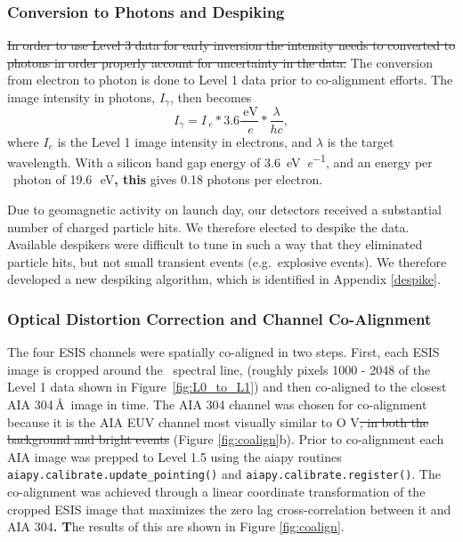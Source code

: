     
\subsubsection{Conversion to Photons and Despiking}
\sout{In order to use Level 3 data for early inversion the intensity needs to  converted to photons in order properly account for uncertainty in the data.}
The conversion from electron to photon is done to Level 1 data prior to co-alignment efforts.
The image intensity in photons, $I_{\gamma}$, then becomes
\begin{equation}
  I_{\gamma} = I_{\SI{}{\elementarycharge}} * 3.6 \frac{\SI{}{\electronvolt}}{\SI{}{\elementarycharge}} * \frac{\lambda}{hc},
\end{equation}
where $I_e$ is the Level 1 image intensity in electrons, and $\lambda$ is the target wavelength.
With a silicon band gap energy of \SI[per-mode=symbol]{3.6}{\electronvolt\per\elementarycharge}, and an energy per \ov \ photon 
of 19.6\,\SI{}{\electronvolt}\textbf{, this} gives 0.18 photons per electron.


Due to geomagnetic activity on launch day, our detectors received a substantial number of charged particle hits. 
We therefore elected to despike the data.
Available despikers were difficult to tune in such a way that they eliminated particle hits, but not small transient events (e.g.\ explosive events). We therefore developed a new despiking algorithm, which is identified in Appendix \ref{despike}.

        
\subsubsection{Optical Distortion Correction and Channel Co-Alignment}
   
  The four ESIS channels were spatially co-aligned in two steps.
First, each ESIS image is cropped around the \ov \ spectral line, (roughly pixels 1000 - 2048 of the Level 1 data shown in Figure~\ref{fig:L0_to_L1}) and then co-aligned to the closest AIA 304\,\AA\ image in time.  
The AIA 304 channel was chosen for co-alignment because it is the AIA EUV channel most visually similar to O V\sout{, in both the background and bright events} (Figure \ref{fig:coalign}b).
Prior to co-alignment each AIA image was prepped to Level 1.5 using the aiapy routines \texttt{aiapy.calibrate.update\_pointing()} and \texttt{aiapy.calibrate.register()}.
The co-alignment was achieved through a linear coordinate transformation of the cropped ESIS image that maximizes the zero lag cross-correlation between it and AIA 304\textbf{. T}he results of this are shown in Figure \ref{fig:coalign}.

